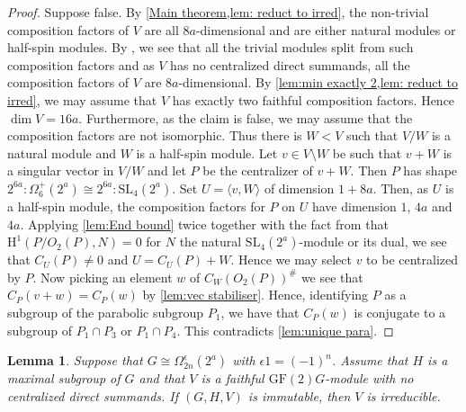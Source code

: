 \documentclass[12pt]{amsart}
\newtheorem{lemma}[theorem]{Lemma}
\theoremstyle{remark}
\theoremstyle{notation}
\theoremstyle{definition}
\newcommand{\GF}{\mathrm{GF}}
\newcommand{\SL}{\mathrm{SL}}
\newcommand{\0}{\emptyset}
\begin{document}
\begin{proof} Suppose false. By \cref{Main theorem,lem: reduct to irred}, the non-trivial composition factors of $V$ are all $8a$-dimensional and are either natural modules or half-spin modules. By     \cite[Tables B and C]{JonesParshall}, we see that all the trivial modules split from such composition factors and as $V$ has no centralized direct summands, all the composition factors of $V$ are $8a$-dimensional. By \cref{lem:min exactly 2,lem: reduct to irred}, we may assume that $V$ has exactly two faithful composition factors. Hence $\dim V=16a$. Furthermore, as the claim is false, we may assume that the composition factors are not isomorphic. Thus there is $W< V$   such that $V/W$ is a natural module and $W$ is a half-spin module. Let $v \in V\setminus W$ be such that $v+W$ is a singular vector in $V/W$ and let $P$ be the centralizer of $v+W$.  Then $P$ has shape $2^{6a}{:}\Omega_{6}^+(2^a)\cong 2^{6a}{:}\SL_4(2^a)$. Set $U=\langle v,W\rangle$ of dimension $1+8a$. Then, as $U$ is a half-spin module, the composition factors for $P$ on $U$ have dimension $1$, $4a$ and $4a$. Applying \cref{lem:End bound} twice together with the fact from \cite[Tables B and C]{JonesParshall} that $\mathrm H^1(P/O_2(P),N)=0$ for $N$ the natural $\SL_4(2^a)$-module or its dual,  we  see that $C_U(P) \ne 0$ and $U= C_U(P)+W$.  Hence we may select $v$ to be centralized by $P$. Now picking an element $w$ of $C_W(O_2(P))^\#$ we see that $C_P( v+w)= C_P(w)$ by \cref{lem:vec stabiliser}. Hence, identifying $P$ as a subgroup of the parabolic subgroup $P_1$, we have that $C_P(w)$ is conjugate to a subgroup of  $P_1 \cap P_3$ or $P_1\cap P_4$. This   contradicts \cref{lem:unique para}.
\end{proof}

\begin{lemma}\label{lem:orthgone} Suppose that $G \cong \Omega_{2n}^\epsilon(2^a)$ with $\epsilon 1 =(-1)^n $.
 Assume that $H$ is a maximal subgroup of $G$ and that $V$ is a faithful $\GF(2)G$-module with no centralized direct summands. If $(G,H,V)$ is immutable, then $V$ is irreducible.
\end{lemma}
\end{document}
